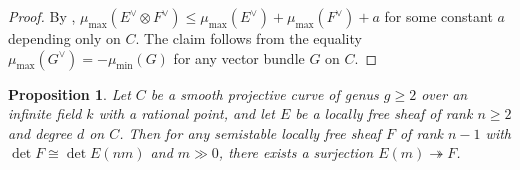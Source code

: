 \documentclass[12pt,reqno]{amsart}
\newtheorem{proposition}[theorem]{Proposition}
\theoremstyle{definition}
\numberwithin{equation}{section}
\begin{document}
	\begin{proof}
		By \cite[Proposition~2.2]{Ch09}, $\mu_{\mathrm{max}}(E^{\vee}\otimes
		F^{\vee})\leq \mu_{\mathrm{max}}(E^{\vee})+\mu_{\mathrm{max}}(F^{\vee})+a$
		for some constant $a$ depending only on $C$. The claim follows from the
		equality $\mu_{\mathrm{max}}(G^{\vee}) = -\mu_{\mathrm{min}}(G)$ for any
		vector bundle $G$ on $C$.
	\end{proof}

	\begin{proposition}\label{prop:semistable-quotient}
		Let $C$ be a smooth projective curve of genus $g \geq 2$ over an infinite
		field $k$ with a rational point, and let $E$ be a locally free sheaf of rank
		$n \geq 2$ and degree $d$ on $C$. Then for any semistable locally free sheaf $F$ of rank
		$n-1$ with $\det F \cong \det E(nm)$ and $m \gg 0$, there exists a
		surjection $E(m) \twoheadrightarrow F$.
	\end{proposition}
	
\end{document}
